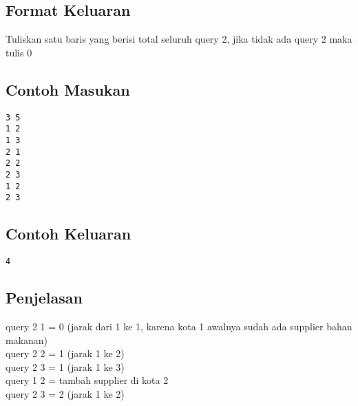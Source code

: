 \documentclass{article}
\begin{document}
\subsection*{Format Keluaran}
Tuliskan satu baris yang berisi total seluruh query 2, jika tidak ada query 2 maka tulis 0
\\

\begin{multicols}{2}
\subsection*{Contoh Masukan}
\begin{lstlisting}
3 5
1 2
1 3
2 1
2 2
2 3
1 2
2 3
\end{lstlisting}
\columnbreak
\subsection*{Contoh Keluaran}
\begin{lstlisting}
4
\end{lstlisting}
\vfill
\null
\end{multicols}

\subsection*{Penjelasan}
query 2 1 = 0 (jarak dari 1 ke 1, karena kota 1 awalnya sudah ada supplier bahan makanan)\\
query 2 2 = 1 (jarak 1 ke 2)\\
query 2 3 = 1 (jarak 1 ke 3)\\
query 1 2 = tambah supplier di kota 2\\
query 2 3 = 2 (jarak 1 ke 2)

\pagebreak
\end{document}
